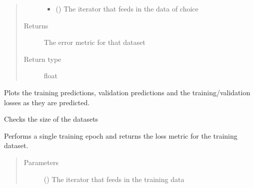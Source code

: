 \documentclass[letterpaper,10pt,english]{sphinxmanual}
\begin{document}
\begin{fulllineitems}
\begin{fulllineitems}
\begin{quote}
\begin{description}
\begin{itemize}
\item {} 
 () \textendash{} The iterator that feeds in the data of choice

\end{itemize}

\item[{Returns}] \leavevmode
The error metric for that dataset

\item[{Return type}] \leavevmode
float

\end{description}\end{quote}

\end{fulllineitems}


\begin{fulllineitems}
\label{\detokenize{deeplearning:Foresight.deeplearning.DeepLearning.live_pred_plot}}
Plots the training predictions, validation predictions and the
training/validation losses as they are predicted.

\end{fulllineitems}


\begin{fulllineitems}
\label{\detokenize{deeplearning:Foresight.deeplearning.DeepLearning.size_check}}
Checks the size of the datasets

\end{fulllineitems}


\begin{fulllineitems}
\label{\detokenize{deeplearning:Foresight.deeplearning.DeepLearning.train}}
Performs a single training epoch and returns the loss metric
for the training dataset.
\begin{quote}\begin{description}
\item[{Parameters}] \leavevmode
{} () \textendash{} The iterator that feeds in the training data


\end{description}
\end{quote}
\end{fulllineitems}
\end{fulllineitems}
\end{document}
